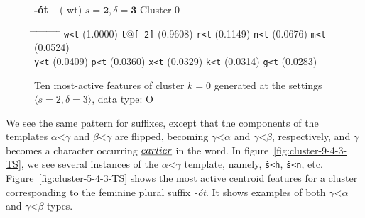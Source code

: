 \begin{figure}[b] 
\begin{mdframed}
{\LARGE \textbf{-\'{o}t}} {\large\,\,\, (-wt)} \hfill \large{$s=\textbf{2}, \delta=\textbf{3}$} \hfill Cluster 0\\
\vspace{-10pt}
\vspace{3pt}
\begin{small}
\begin{tabbing}
\hspace{6ex} \= \hspace{12ex} \= \hspace{7ex} \= \hspace{12ex} \= \hspace{7ex} \= \hspace{12ex} \= \hspace{6ex} \= \hspace{12ex} \= \hspace{6ex} \= \hspace{9ex} \kill
\texttt{w<t} \> (1.0000) \> \texttt{t}@\texttt{[-2]} \> (0.9608) \> \texttt{r<t} \> (0.1149) \> \texttt{n<t} \> (0.0676) \> \texttt{m<t} \> (0.0524) \\
\texttt{y<t} \> (0.0409) \> \texttt{p<t} \> (0.0360) \> \texttt{x<t} \> (0.0329) \> \texttt{k<t} \> (0.0314) \> \texttt{g<t} \> (0.0283)
\end{tabbing}
\caption{Ten most-active features of cluster $k = 0$ generated at the settings $\langle{s}=2,\delta=3\rangle$, data type: O}
\label{fig:cluster-0-2-3-O}
\end{small}
\end{mdframed}
\end{figure}

We see the same pattern for suffixes, except that the components of the templates $\alpha$<$\gamma$ and $\beta$<$\gamma$ are flipped, becoming $\gamma$<$\alpha$ and $\gamma$<$\beta$, respectively, and $\gamma$ becomes a character occurring $\emph{earlier}$ in the word. In figure~\ref{fig:cluster-9-4-3-TS}, we see several instances of the $\alpha$<$\gamma$ template, namely, \texttt{\v{s}<h}, \texttt{\v{s}<n}, etc. Figure~\ref{fig:cluster-5-4-3-TS} shows the most active centroid features for a cluster corresponding to the feminine plural suffix \textit{-\'{o}t}. It shows examples of both $\gamma$<$\alpha$ and $\gamma$<$\beta$ types.

